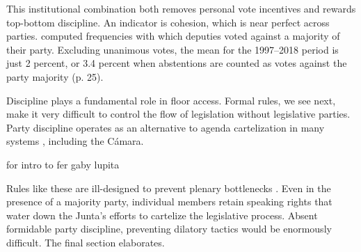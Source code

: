 This institutional combination both removes personal vote incentives \citep{carey.shugart.1995,cain.etal.1987} and rewards top-bottom discipline. An indicator is cohesion, which is near perfect across parties. \citet{tellez-del-rio.2018} computed frequencies with which deputies voted against a majority of their party. Excluding unanimous votes, the mean for the 1997--2018 period is just 2 percent, or 3.4 percent when abstentions are counted as votes against the party majority (p. 25). 

Discipline plays a fundamental role in floor access. Formal rules, we see next, make it very difficult to control the flow of legislation without legislative parties. Party discipline operates as an alternative to agenda cartelization in many systems \citep{prata.2006}, including the Cámara. 




for intro to fer gaby lupita


Rules like these are ill-designed to prevent plenary bottlenecks \citep{cox.2006}. Even in the presence of a majority party, individual members retain speaking rights that water down the Junta's efforts to cartelize the legislative process. Absent formidable party discipline, preventing dilatory tactics would be enormously difficult. The final section elaborates. 


